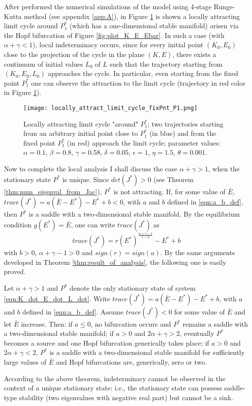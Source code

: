 After performed the numerical simulations of the model using 4-stage Runge-Kutta method (see appendix \ref{app:A}), in Figure \ref{fig:local_attract_lim_cycle_P1} is shown a locally attracting limit cycle around $P_1^*$ (which has a one-dimensional stable manifold) arisen via the Hopf bifurcation of Figure \ref{fig:plot_K_E_Ebar}. In such a case (with $\alpha+\gamma<1$), local indeterminacy occurs, since for every initial point $(K_0,E_0)$ close to the projection of the cycle in the plane $(K,E)$, there exists a continuum of initial values $L_0$ of $L$ such that the trajectory starting from $(K_0,E_0,L_0)$ approaches the cycle. In particular, even starting from the fixed point  $P_1^*$ one can observe the attraction to the limit cycle (trajectory in red color in Figure \ref{fig:local_attract_lim_cycle_P1}).
\begin{figure}[h!]
	\centering
	\texttt{[image: locally\_attract\_limit\_cycle\_fixPnt\_P1.png]}
	\caption{Locally attracting limit cycle "around" $P_1^*$; two trajectories starting from an arbitrary initial point close to $P_1^*$ (in blue) and from the fixed point $P_1^*$ (in red) approach the limit cycle; parameter values: $\alpha=0.1$, $\beta=0.8$, $\gamma=0.58$, $\delta=0.05$, $\epsilon=1$, $\eta=1.5$, $\theta=0.001$.}
	\label{fig:local_attract_lim_cycle_P1}
\end{figure}

Now to complete the local analysis I shall discuss the case $\alpha+\gamma>1$, when the stationary state $P^*$ is unique. Since $det(J^*) > 0$ (see Theorem \ref{thm:num_eigenval_from_Jac}), $P^*$ is not attracting. If, for some value of $\bar{E}$, $trace(J^*)=a(\bar{E}-E^*)-E^*+b<0$, with $a$ and $b$ defined in \eqref{eqn:a_b_def}, then $P^*$ is a saddle with a two-dimensional stable manifold. By the equilibrium condition $g(E^*)=\bar{E}$, one can write $trace(J^*)$ as
$$trace(J^*)=r(E^*)^{\frac{\alpha+\gamma-1}{1-\alpha}}-E^*+b$$
with $b>0$, $\alpha+\gamma-1>0$ and $sign(r)=sign(a)$. 
By the same arguments developed in Theorem \ref{thm:result_of_analysis}, the following one is easily proved.
\begin{thm} \label{thm:5_no_indeter_with_unique_fixPnt}
	Let $\alpha+\gamma>1$ and $P^*$ denote the only stationary state of system \eqref{eqn:K_dot_E_dot_L_dot}. Write $trace(J^*)=a(\bar{E}-E^*)-E^*+b$, with $a$ and $b$ defined in \eqref{eqn:a_b_def}. Assume $trace(J^*) < 0$ for some value of $\bar{E}$ and let $\bar{E}$ increase. Then: if $a\leq0$, no bifurcation occurs and $P^*$ remains a saddle with a two-dimensional stable manifold; if $a>0$ and $2\alpha+\gamma>2$, eventually $P^*$ becomes a source and one Hopf bifurcation generically takes place; if $a>0$ and $2\alpha+\gamma<2$, $P^*$ is a saddle with a two-dimensional stable manifold for sufficiently large values of $\bar{E}$ and Hopf bifurcations are, generically, zero or two.
\end{thm}
According to the above theorem, indeterminacy cannot be observed in the context of a unique stationary state: i.e., the stationary state can possess saddle-type stability (two eigenvalues with negative real part) but cannot be a sink.